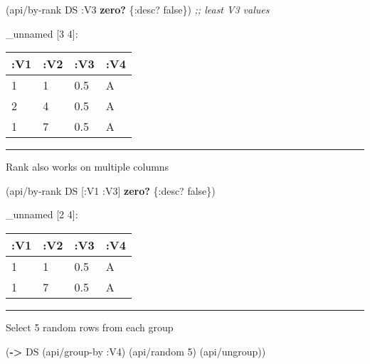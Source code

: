 \documentclass[]{article}
\newenvironment{Shaded}{\begin{snugshade}}{\end{snugshade}}
\newcommand{\AttributeTok}[1]{\textcolor[rgb]{0.77,0.63,0.00}{#1}}
\newcommand{\CommentTok}[1]{\textcolor[rgb]{0.56,0.35,0.01}{\textit{#1}}}
\newcommand{\DecValTok}[1]{\textcolor[rgb]{0.00,0.00,0.81}{#1}}
\newcommand{\KeywordTok}[1]{\textcolor[rgb]{0.13,0.29,0.53}{\textbf{#1}}}
\newcommand{\NormalTok}[1]{#1}
\newcommand{\VariableTok}[1]{\textcolor[rgb]{0.00,0.00,0.00}{#1}}
\begin{document}
\begin{Shaded}
\begin{Highlighting}[]
\NormalTok{(api/by-rank DS }\AttributeTok{:V3} \KeywordTok{zero?}\NormalTok{ \{}\AttributeTok{:desc}\NormalTok{? }\VariableTok{false}\NormalTok{\}) }\CommentTok{;; least V3 values}
\end{Highlighting}
\end{Shaded}

\_unnamed {[}3 4{]}:

\begin{longtable}[]{@{}llll@{}}
\toprule
:V1 & :V2 & :V3 & :V4\tabularnewline
\midrule
\endhead
1 & 1 & 0.5 & A\tabularnewline
2 & 4 & 0.5 & A\tabularnewline
1 & 7 & 0.5 & A\tabularnewline
\bottomrule
\end{longtable}

\begin{center}\rule{0.5\linewidth}{0.5pt}\end{center}

Rank also works on multiple columns

\begin{Shaded}
\begin{Highlighting}[]
\NormalTok{(api/by-rank DS [}\AttributeTok{:V1} \AttributeTok{:V3}\NormalTok{] }\KeywordTok{zero?}\NormalTok{ \{}\AttributeTok{:desc}\NormalTok{? }\VariableTok{false}\NormalTok{\})}
\end{Highlighting}
\end{Shaded}

\_unnamed {[}2 4{]}:

\begin{longtable}[]{@{}llll@{}}
\toprule
:V1 & :V2 & :V3 & :V4\tabularnewline
\midrule
\endhead
1 & 1 & 0.5 & A\tabularnewline
1 & 7 & 0.5 & A\tabularnewline
\bottomrule
\end{longtable}

\begin{center}\rule{0.5\linewidth}{0.5pt}\end{center}

Select 5 random rows from each group

\begin{Shaded}
\begin{Highlighting}[]
\NormalTok{(}\KeywordTok{->}\NormalTok{ DS}
\NormalTok{    (api/group-by }\AttributeTok{:V4}\NormalTok{)}
\NormalTok{    (api/random }\DecValTok{5}\NormalTok{)}
\NormalTok{    (api/ungroup))}
\end{Highlighting}
\end{Shaded}
\end{document}
